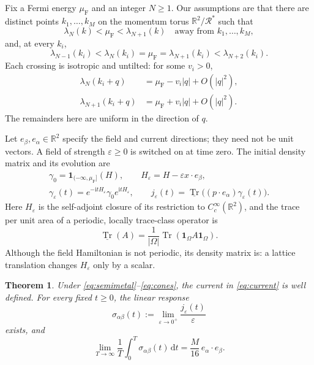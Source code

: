 \documentclass[11pt,a4paper]{article}
\newcommand{\R}{\mathbb R}
\newcommand{\ind}{\mathbf 1}
\newcommand{\lat}{\mathcal R}
\newcommand{\trv}{\underline{\operatorname{Tr}}}
\newcommand{\dd}{\,\mathrm d}
\newcommand{\ii}{\mathrm i}
\DeclareMathOperator{\Tr}{Tr}
\newtheorem{theorem}{Theorem}
\theoremstyle{remark}
\numberwithin{equation}{section}
\begin{document}
Fix a Fermi energy $\mu_{\mathrm F}$ and an integer $N\geq1$.
Our assumptions are that there are distinct points
$k_1,\ldots,k_M$ on the momentum torus $\R^2/\lat^*$ such that
\begin{equation}
 \lambda_N(k)<\mu_{\mathrm F}<\lambda_{N+1}(k)
 \quad\text{away from }k_1,\ldots,k_M,
 \label{eq:semimetal}
\end{equation}
and, at every $k_i$,
\begin{equation}
 \lambda_{N-1}(k_i)<\lambda_N(k_i)=\mu_{\mathrm F}
 =\lambda_{N+1}(k_i)<\lambda_{N+2}(k_i).
 \label{eq:isolation}
\end{equation}
Each crossing is isotropic and untilted: for some $v_i>0$,
\begin{equation}
 \begin{split}
 \lambda_N(k_i+q)&=\mu_{\mathrm F}-v_i|q|+O(|q|^2),\\
 \lambda_{N+1}(k_i+q)&=\mu_{\mathrm F}+v_i|q|+O(|q|^2).
 \end{split}
 \label{eq:cones}
\end{equation}
The remainders here are uniform in the direction of $q$.

Let $e_\beta,e_\alpha\in\R^2$ specify the field and current directions;
they need not be unit vectors. A field of strength $\varepsilon\geq0$
is switched on at time zero. The initial density matrix and its evolution
are
\begin{equation}
 \begin{gathered}
 \gamma_0=\ind_{(-\infty,\mu_{\mathrm F}]}(H),\qquad
 H_\varepsilon=H-\varepsilon x\cdot e_\beta,\\
 \gamma_\varepsilon(t)
 =e^{-\ii tH_\varepsilon}\gamma_0e^{\ii tH_\varepsilon},\qquad
 j_\varepsilon(t)=\trv\bigl((p\cdot e_\alpha)
                                  \gamma_\varepsilon(t)\bigr).
 \end{gathered}
 \label{eq:current}
\end{equation}
Here $H_\varepsilon$ is the self-adjoint closure of its restriction to
$C_c^\infty(\R^2)$, and the trace per unit area of a periodic, locally
trace-class operator is
\begin{equation}
 \trv(A)=\frac1{|\Omega|}\Tr(\ind_\Omega A\ind_\Omega).
 \label{eq:trace-per-area}
\end{equation}
Although the field Hamiltonian is not periodic, its density matrix is:
a lattice translation changes $H_\varepsilon$ only by a scalar.

\begin{theorem}\label{thm:main}
Under \eqref{eq:semimetal}--\eqref{eq:cones}, the current in
\eqref{eq:current} is well defined. For every fixed $t\geq0$, the
linear response
\[
 \sigma_{\alpha\beta}(t)
 :=\lim_{\varepsilon\to0^+}\frac{j_\varepsilon(t)}{\varepsilon}
\]
exists, and
\begin{equation}
 \lim_{T\to\infty}\frac1T\int_0^T\sigma_{\alpha\beta}(t)\dd t
 =\frac{M}{16}\,e_\alpha\cdot e_\beta.
 \label{eq:theorem}
\end{equation}
\end{theorem}
\end{document}
